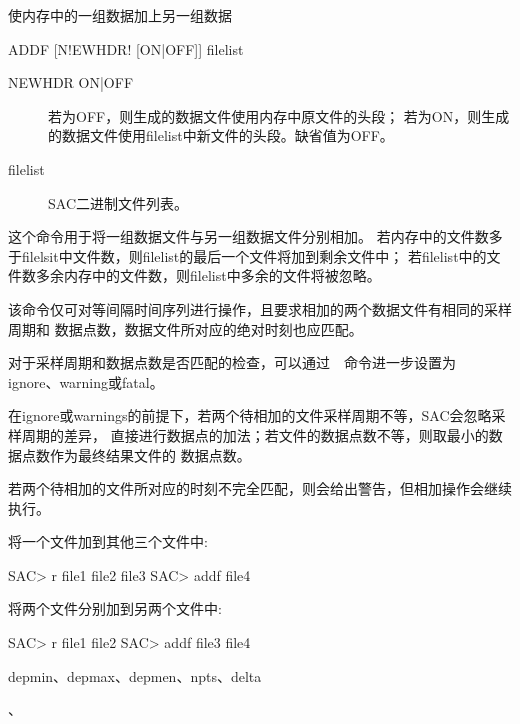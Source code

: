 \label{cmd:addf}

使内存中的一组数据加上另一组数据

\begin{SACSTX}
ADDF [N!EWHDR! [ON|OFF]] filelist
\end{SACSTX}

\begin{description}
\item [NEWHDR ON|OFF] 若为OFF，则生成的数据文件使用内存中原文件的头段；
    若为ON，则生成的数据文件使用filelist中新文件的头段。缺省值为OFF。
\item [filelist] SAC二进制文件列表。
\end{description}

这个命令用于将一组数据文件与另一组数据文件分别相加。
若内存中的文件数多于filelsit中文件数，则filelist的最后一个文件将加到剩余文件中；
若filelist中的文件数多余内存中的文件数，则filelist中多余的文件将被忽略。

该命令仅可对等间隔时间序列进行操作，且要求相加的两个数据文件有相同的采样周期和
数据点数，数据文件所对应的绝对时刻也应匹配。

对于采样周期和数据点数是否匹配的检查，可以通过~~命令进一步设置为
ignore、warning或fatal。

在ignore或warnings的前提下，若两个待相加的文件采样周期不等，SAC会忽略采样周期的差异，
直接进行数据点的加法；若文件的数据点数不等，则取最小的数据点数作为最终结果文件的
数据点数。

若两个待相加的文件所对应的时刻不完全匹配，则会给出警告，但相加操作会继续执行。

将一个文件加到其他三个文件中:
\begin{SACCode}
SAC> r file1 file2 file3
SAC> addf file4
\end{SACCode}

将两个文件分别加到另两个文件中:
\begin{SACCode}
SAC> r file1 file2
SAC> addf file3 file4
\end{SACCode}

depmin、depmax、depmen、npts、delta

、
